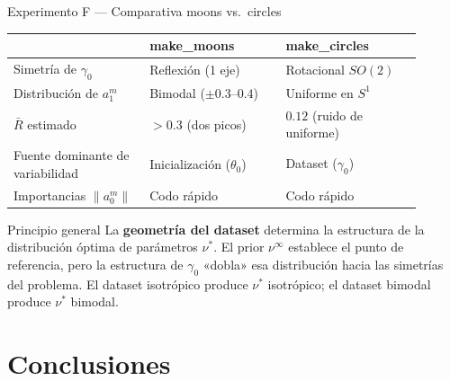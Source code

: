 \documentclass[10pt]{beamer}
\begin{document}
\begin{frame}{Experimento F — Comparativa moons vs.\ circles}
\small
\begin{center}
\begin{tabular}{p{0.30\linewidth}p{0.30\linewidth}p{0.30\linewidth}}
  \toprule
  & \textbf{make\_moons} & \textbf{make\_circles} \\
  \midrule
  Simetría de $\gamma_0$ & Reflexión (1 eje) & Rotacional $SO(2)$ \\[6pt]
  Distribución de $a_1^m$ & Bimodal ($\pm 0.3$--$0.4$) & Uniforme en $S^1$ \\[6pt]
  $\bar{R}$ estimado & $> 0.3$ (dos picos) & $0.12$ (ruido de uniforme) \\[6pt]
  Fuente dominante de variabilidad & Inicialización ($\theta_0$) & Dataset ($\gamma_0$) \\[6pt]
  Importancias $\|a_0^m\|$ & Codo rápido & Codo rápido \\
  \bottomrule
\end{tabular}
\end{center}

\bigskip
\begin{block}{Principio general}
  La \textbf{geometría del dataset} determina la estructura de la distribución óptima de parámetros $\nu^*$. El prior $\nu^\infty$ establece el punto de referencia, pero la estructura de $\gamma_0$ «dobla» esa distribución hacia las simetrías del problema. El dataset isotrópico produce $\nu^*$ isotrópico; el dataset bimodal produce $\nu^*$ bimodal.
\end{block}

\end{frame}

\section{Conclusiones}
\end{document}
